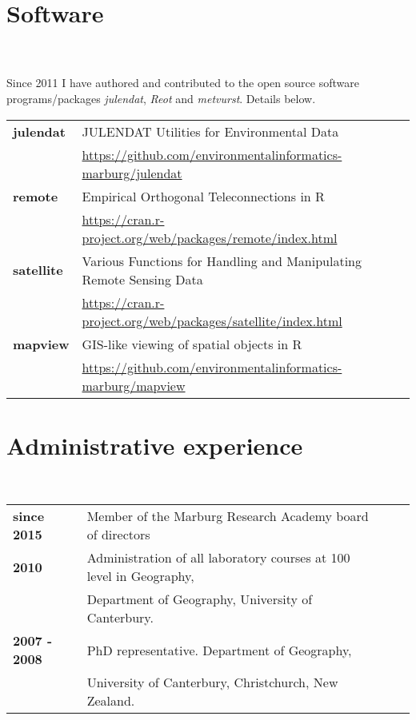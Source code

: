 \documentclass[a4paper,11pt]{article}
\begin{document}
\section{Software}
\hrulefill \\
\hfill \\
Since 2011 I have authored and contributed to the open source software programs/packages \textit{julendat}, \textit{Reot} and \textit{metvurst}. Details below.
\linebreak{}
\linebreak{}
\begin{tabular}{ll}
\textbf{julendat} & JULENDAT Utilities for Environmental Data\\
				  & \url{https://github.com/environmentalinformatics-marburg/julendat}\\
\textbf{remote} 	  & Empirical Orthogonal Teleconnections in R\\
				  & \url{https://cran.r-project.org/web/packages/remote/index.html}\\
\textbf{satellite} & Various Functions for Handling and Manipulating Remote Sensing Data\\
				  & \url{https://cran.r-project.org/web/packages/satellite/index.html}\\
\textbf{mapview} & GIS-like viewing of spatial objects in R\\
				  & \url{https://github.com/environmentalinformatics-marburg/mapview}\\
\end{tabular}
\linebreak{}

\section{Administrative experience}
\hrulefill \\
\begin{tabular}{llll} \\
\textbf{since 2015} & Member of the Marburg Research Academy board of directors\\
\textbf{2010} & Administration of all laboratory courses at 100 level in Geography,\\
			  & Department of Geography, University of Canterbury.\\
\textbf{2007 - 2008} & PhD representative. Department of Geography,\\
			  & University of Canterbury, Christchurch, New Zealand.
\end{tabular}
\linebreak{}
\pagebreak{}
\end{document}
